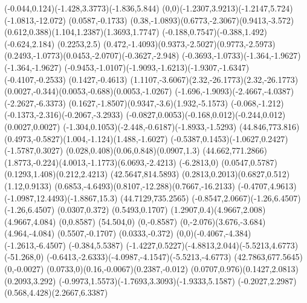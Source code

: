 {    \rcurveto(-0.044,0.124)(-1.428,3.3773)(-1.836,5.844)
    \rcurveto(0,0)(-1.2307,3.9213)(-1.2147,5.724)
    \rlineto(-1.0813,-12.072)
    \rlineto(0.0587,-0.1733)
    \rcurveto(0.38,-1.0893)(0.6773,-2.3067)(0.9413,-3.572)
    \rcurveto(0.612,0.388)(1.104,1.2387)(1.3693,1.7747)
    \rcurveto(-0.188,0.7547)(-0.388,1.492)(-0.624,2.184)
    \rlineto(0.2253,2.5)
    \rcurveto(0.472,-1.4093)(0.9373,-2.5027)(0.9773,-2.5973)
    \rcurveto(0.2493,-1.0773)(0.0453,-2.0707)(-0.3627,-2.948)
    \rcurveto(-0.3693,-1.0733)(-1.364,-1.9627)(-1.364,-1.9627)
    \rcurveto(-0.9453,-1.0107)(-1.9093,-1.6213)(-1.9307,-1.6347)
    \rlineto(-0.4107,-0.2533)
    \rlineto(0.1427,-0.4613)
    \rcurveto(1.1107,-3.6067)(2.32,-26.1773)(2.32,-26.1773)
    \rcurveto(0.0027,-0.344)(0.0053,-0.688)(0.0053,-1.0267)
    \rcurveto(-1.696,-1.9093)(-2.4667,-4.0387)(-2.2627,-6.3373)
    \rcurveto(0.1627,-1.8507)(0.9347,-3.6)(1.932,-5.1573)
    \rcurveto(-0.068,-1.212)(-0.1373,-2.316)(-0.2067,-3.2933)
    \rcurveto(-0.0827,0.0053)(-0.168,0.012)(-0.244,0.012)
    \rlineto(0.0027,0.0027)
    \rcurveto(-1.304,0.1053)(-2.448,-0.6187)(-1.8933,-1.5293)
    \moveto(44.846,773.816)
    \rcurveto(0.4973,-0.5827)(1.004,-1.124)(1.488,-1.6027)
    \rcurveto(-0.5387,0.1453)(-1.0627,0.2427)(-1.5787,0.3027)
    \rcurveto(0.028,0.408)(0.06,0.848)(0.0907,1.3)
    \moveto(44.662,771.2866)
    \rcurveto(1.8773,-0.224)(4.0013,-1.1773)(6.0693,-2.4213)
    \rlineto(-6.2813,0)
    \rcurveto(0.0547,0.5787)(0.1293,1.408)(0.212,2.4213)
    \moveto(42.5647,814.5893)
    \rcurveto(0.2813,0.2013)(0.6827,0.512)(1.12,0.9133)
    \rcurveto(0.6853,-4.6493)(0.8107,-12.288)(0.7667,-16.2133)
    \rcurveto(-0.4707,4.9613)(-1.0987,12.4493)(-1.8867,15.3)
    \closepath
    \moveto(44.7129,735.2565)
    \rcurveto(-0.8547,2.0667)(-1.26,6.4507)(-1.26,6.4507)
    \rlineto(0.0307,0.372)
    \rlineto(0.5493,0.1707)
    \rcurveto(1.2907,0.4)(4.9667,2.008)(4.9667,4.084)
    \rlineto(0,0.8587)
    \rlineto(54.504,0)
    \rlineto(0,-0.8587)
    \rcurveto(0,-2.076)(3.676,-3.684)(4.964,-4.084)
    \rlineto(0.5507,-0.1707)
    \rlineto(0.0333,-0.372)
    \rcurveto(0,0)(-0.4067,-4.384)(-1.2613,-6.4507)
    \rlineto(-0.384,5.5387)
    \rcurveto(-1.4227,0.5227)(-4.8813,2.044)(-5.5213,4.6773)
    \rlineto(-51.268,0)
    \rcurveto(-0.6413,-2.6333)(-4.0987,-4.1547)(-5.5213,-4.6773)
    \closepath
    \moveto(42.7863,677.5645)
    \rlineto(0,-0.0027)
    \rcurveto(0.0733,0)(0.16,-0.0067)(0.2387,-0.012)
    \rcurveto(0.0707,0.976)(0.1427,2.0813)(0.2093,3.292)
    \rcurveto(-0.9973,1.5573)(-1.7693,3.3093)(-1.9333,5.1587)
    \rcurveto(-0.2027,2.2987)(0.568,4.428)(2.2667,6.3387)
}
